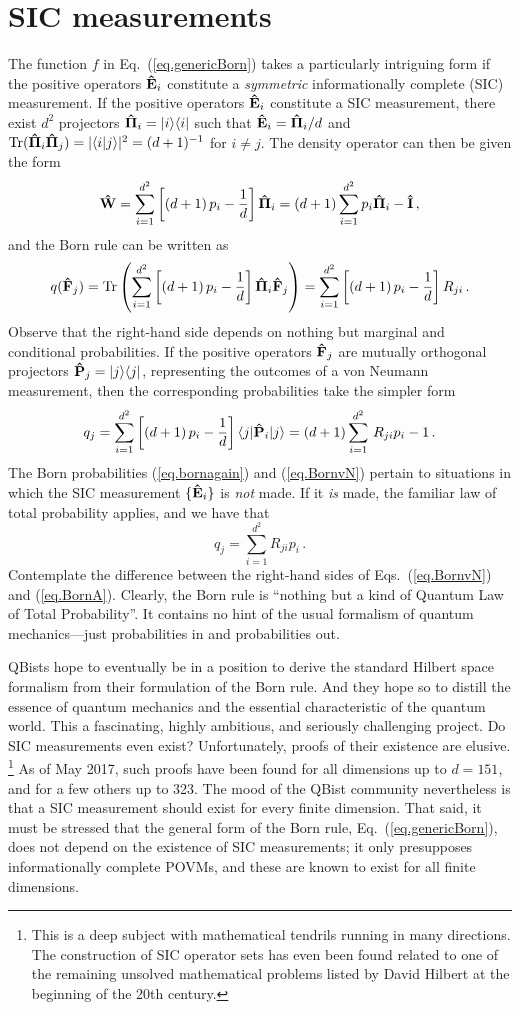 \documentclass[smallextended]{svjour3}
\newcommand{\braket}[2]{\langle#1|#2\rangle}
\newcommand{\be}{\begin{equation}}
\newcommand{\ee}{\end{equation}}
\newcommand{\hE}{{\bf\hat E}}
\newcommand{\hF}{{\bf\hat F}}
\newcommand{\hP}{{\bf\hat P}}
\newcommand{\hW}{{\bf\hat W}}
\newcommand{\hPi}{{\bf\hat\Pi}}
\newcommand{\hI}{{\bf\hat I}}
\newcommand{\ketbra}[2]{\vert#1\rangle\langle#2\vert}
\newcommand{\sandwich}[3]{\langle#1\vert#2\vert#3\rangle}
\begin{document}
\section{SIC measurements}\label{sec.sic}
The function $f$ in Eq.~(\ref{eq.genericBorn}) takes a particularly intriguing form if the positive operators $\hE_i$ constitute a \emph{symmetric} informationally complete (SIC) measurement. If the positive operators $\hE_i$ constitute a SIC measurement, there exist $d^2$ projectors $\hPi_i=\ketbra ii$ such that $\hE_i=\hPi_i/d$ and $\hbox{Tr}(\hPi_i\hPi_j)=|\braket ij|^2=(d+1)^{-1}$ for $i\neq j$. The density operator can then be given the form\cite{Fuchs_Perimeter,Fuchs2004}
\be
\hW=\sum_{i=1}^{d^2}\left[(d+1)\,p_i-\frac1d\right]\hPi_i=
(d+1)\sum_{i=1}^{d^2}p_i\hPi_i-\hI\,,
\label{eq.bado}
\ee
and the Born rule can be written as
\be
q(\hF_j)=\hbox{Tr}\left(\sum_{i=1}^{d^2}
\left[(d+1)\,p_i-\frac1d\right]\hPi_i\hF_j\right)
=\sum_{i=1}^{d^2}\left[(d+1)\,p_i-\frac1d\right]R_{ji}\,.
\label{eq.bornagain}
\ee
Observe that the right-hand side depends on nothing but marginal and
conditional probabilities. If the positive operators $\hF_j$ are mutually orthogonal projectors $\hP_j=\ketbra jj$, representing the outcomes of a von Neumann measurement, then the corresponding probabilities take the simpler form
\be
q_j=\sum_{i=1}^{d^2}
\left[(d+1)\,p_i-\frac1d\right]\sandwich j{\hP_i}j
=(d+1)\sum_{i=1}^{d^2}\,R_{ji}p_i-1\,.
\label{eq.BornvN}
\ee
The Born probabilities (\ref{eq.bornagain}) and (\ref{eq.BornvN}) pertain to situations in which the SIC measurement $\{\hE_i\}$ is \emph{not} made. If it \emph{is} made, the familiar law of total probability applies, and we have that
\be
q_j=\sum_{i=1}^{d^2}R_{ji}p_i \,.
\label{eq.BornA}
\ee
Contemplate the difference between the right-hand sides of Eqs.~(\ref{eq.BornvN}) and (\ref{eq.BornA}). Clearly, the Born rule is ``nothing but a kind of Quantum Law of Total Probability''.\cite{Fuchs_Perimeter} It contains no hint of the usual formalism of quantum mechanics---just probabilities in and probabilities out.

QBists hope to eventually be in a position to derive the standard Hilbert space formalism from their formulation of the Born rule. And they hope so to distill the essence of quantum mechanics and the essential characteristic of the quantum world. This a fascinating, highly ambitious, and  seriously challenging project. Do SIC measurements even exist? Unfortunately, proofs of their existence are elusive.%
\footnote{This is a deep subject with mathematical tendrils running in many directions.\cite{Applebyetal2015} The construction of SIC operator sets has even been found related to one of the remaining unsolved mathematical problems listed by David Hilbert at the beginning  of the 20th century.\cite{Applebyetal2017}}
As of May 2017, such proofs have been found for all dimensions up to $d{=}151$, and for a few others up to 323.\cite{Fuchs_Notwithstanding} The mood of the QBist community nevertheless is that a SIC measurement should exist for every finite dimension. That said, it must be stressed that the general form of the Born rule, Eq.~(\ref{eq.genericBorn}), does not depend on the existence of SIC measurements; it only presupposes informationally complete POVMs, and these are known to exist for all finite dimensions.
\end{document}
